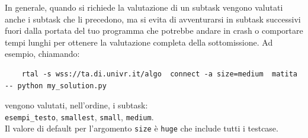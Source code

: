 \documentclass[a4paper,11pt]{article}
\begin{document}
In generale, quando si richiede la valutazione di un subtask vengono valutati anche i subtask che li precedono, ma si evita di avventurarsi in subtask successivi  fuori dalla portata del tuo programma che potrebbe andare in crash o comportare tempi lunghi per ottenere la valutazione completa della sottomissione. Ad esempio, chiamando:

\begin{verbatim}
    rtal -s wss://ta.di.univr.it/algo  connect -a size=medium  matita -- python my_solution.py
\end{verbatim}

\noindent
vengono valutati, nell'ordine, i subtask:\\

{\tt esempi\_testo}, {\tt smallest}, {\tt small}, {\tt medium}.\\

\noindent
Il valore di default per l'argomento {\tt size} è {\tt huge} che include tutti i testcase.\\
\end{document}
